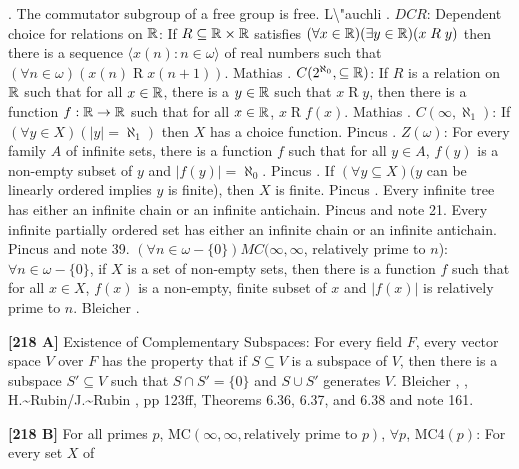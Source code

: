 \cite{1970}.
\medskip
{}  The commutator subgroup of a free group is free.
\ac{L\"auchli} \cite{1962}.
\medskip
{} $DCR$: Dependent choice for relations on
$\Bbb R$: If $R\subseteq\Bbb R\times\Bbb R$ satisfies $(\forall x\in
\Bbb R)(\exists y\in\Bbb R)(x\mathrel R y)$ then there is a sequence
$\langle x(n): n\in\omega\rangle$ of real numbers such that
$(\forall n\in\omega)(x(n)\mathrel R x(n+1))$. \ac{Mathias} \cite{1977a}.
\medskip
{} $C(2^{\aleph_{0}},\subseteq{\Bbb R})$: If $R$ is a
relation on ${\Bbb R}$ such that for all $x\in{\Bbb R}$, there is a
$y\in{\Bbb R}$ such that $x\mathrel R y$, then there is a function
$f: {\Bbb R} \rightarrow{\Bbb R}$ such that for all $x\in{\Bbb R}$,
$x\mathrel R f(x)$.  \ac{Mathias} \cite{1977a}.
\medskip
{} $C(\infty,\aleph_{1})$: If $(\forall y\in X)(|y|
= \aleph_{1})$ then $X$ has a choice function.  \ac{Pincus} \cite{1977a}.
\medskip
{} $Z(\omega)$: For every family $A$ of infinite
sets, there is a function $f$ such that for all $y\in A$, $f(y)$
is a non-empty subset of $y$ and $|f(y)|=\aleph_{0}$. \ac{Pincus}
\cite{1977a}.
\medskip
{} If $(\forall y\subseteq X)(y$ can be linearly
ordered implies $y$ is finite), then $X$ is finite. \ac{Pincus}
\cite{1972a}.
\medskip
{} Every infinite tree has either an infinite
chain or an infinite antichain.  \ac{Pincus} \cite{1972a} and note 21.
\medskip
{} Every infinite partially ordered set has either
an infinite chain or an infinite antichain. \ac{Pincus} \cite{1972a}
and note 39.
\medskip
{} $(\forall n\in\omega - \{0\}) MC(\infty,\infty
$, relatively prime to $n$): $\forall n\in\omega -\{0\}$, if $X$ is a
set of non-empty sets, then  there  is  a function $f$ such that
for all $x\in X$, $f(x)$ is a non-empty, finite subset of $x$
and $|f(x)|$ is relatively prime to $n$.  \ac{Bleicher} \cite{1965}.
\smallskip
\item{}{\bf [218 A]} Existence of Complementary Subspaces:  For every
field $F$, every vector space $V$ over $F$ has the property that if
$S\subseteq V$ is a subspace of $V$, then there is a subspace $S'\subseteq
V$ such that $S\cap S'= \{0\}$ and $S\cup S'$ generates $V$. \ac{Bleicher}
\cite{1964}, \cite{1965}, \ac{H.~Rubin/J.~Rubin} \cite{1985}, pp 123ff,
Theorems 6.36, 6.37, and 6.38 and note 161.
\smallskip
\item{}{\bf [218 B]} For all primes $p$, MC$(\infty,\infty,\text{
relatively prime to $p$})$, $\forall p$, MC4$(p)$:  For every set $X$ of
